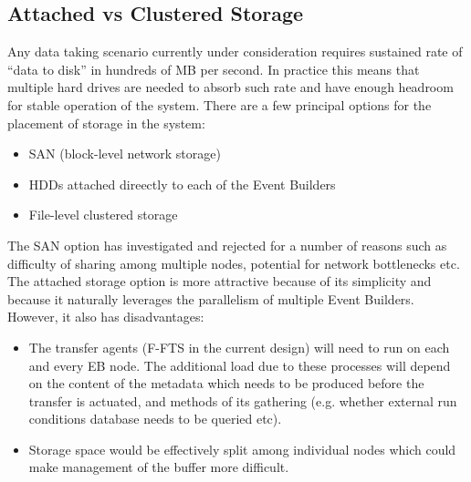 \documentclass[pdftex,12pt,letter]{article}
\begin{document}
\subsection{Attached vs Clustered Storage}
Any data taking scenario currently under consideration requires sustained rate
of ``data to disk'' in hundreds of MB per second. In practice this means that
multiple hard drives are needed to absorb such rate and have enough headroom
for stable operation of the system.
There are a few principal options for the placement of storage in the system:
\begin{itemize}
\item SAN (block-level network storage)
\item HDDs attached direectly to each of the Event Builders
\item File-level clustered storage
\end{itemize}

\noindent The SAN option has investigated and rejected for a number of reasons such as difficulty of sharing among multiple
nodes, potential for network bottlenecks etc. The attached storage option is more attractive because of its simplicity and because it
naturally leverages the parallelism of multiple Event Builders.
However, it also has disadvantages:
\begin{itemize}
\item The transfer agents (F-FTS in the current design) will need to run on each and every EB node. The additional load
due to these processes will depend on the content of the metadata which needs to be produced before the
transfer is actuated, and methods of its gathering (e.g. whether external run conditions database needs to be queried etc).

\item Storage space would be effectively split among individual nodes which could make management of the buffer more difficult.
\end{itemize}
\end{document}
